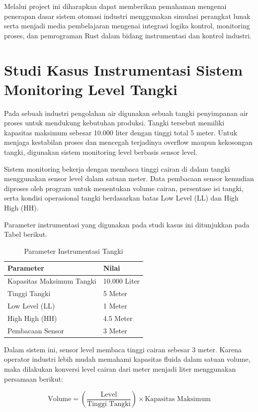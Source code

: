 \documentclass[12pt,a4paper]{article}
\begin{document}
Melalui project ini diharapkan dapat memberikan pemahaman mengenai penerapan dasar sistem otomasi industri menggunakan simulasi perangkat lunak serta menjadi media pembelajaran mengenai integrasi logika kontrol, monitoring proses, dan pemrograman Rust dalam bidang instrumentasi dan kontrol industri.

\section{Studi Kasus Instrumentasi Sistem Monitoring Level Tangki}

Pada sebuah industri pengolahan air digunakan sebuah tangki penyimpanan air proses untuk mendukung kebutuhan produksi. Tangki tersebut memiliki kapasitas maksimum sebesar 10.000 liter dengan tinggi total 5 meter. Untuk menjaga kestabilan proses dan mencegah terjadinya overflow maupun kekosongan tangki, digunakan sistem monitoring level berbasis sensor level.

Sistem monitoring bekerja dengan membaca tinggi cairan di dalam tangki menggunakan sensor level dalam satuan meter. Data pembacaan sensor kemudian diproses oleh program untuk menentukan volume cairan, persentase isi tangki, serta kondisi operasional tangki berdasarkan batas Low Level (LL) dan High High (HH).

Parameter instrumentasi yang digunakan pada studi kasus ini ditunjukkan pada Tabel berikut.

\begin{table}[h]
\centering
\caption{Parameter Instrumentasi Tangki}
\begin{tabular}{|l|l|}
\hline
Parameter & Nilai \\ \hline
Kapasitas Maksimum Tangki & 10.000 Liter \\ \hline
Tinggi Tangki & 5 Meter \\ \hline
Low Level (LL) & 1 Meter \\ \hline
High High (HH) & 4.5 Meter \\ \hline
Pembacaan Sensor & 3 Meter \\ \hline
\end{tabular}
\end{table}

Dalam sistem ini, sensor level membaca tinggi cairan sebesar 3 meter. Karena operator industri lebih mudah memahami kapasitas fluida dalam satuan volume, maka dilakukan konversi level cairan dari meter menjadi liter menggunakan persamaan berikut:

\begin{equation}
\text{Volume} = \left( \frac{\text{Level}}{\text{Tinggi Tangki}} \right) \times \text{Kapasitas Maksimum}
\end{equation}
\end{document}
